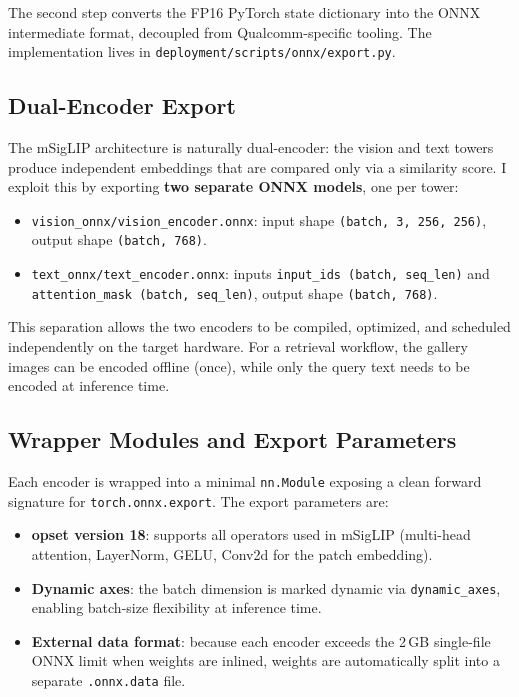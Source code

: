 \documentclass[../main.tex]{subfiles}
\begin{document}
\noindent The second step converts the FP16 PyTorch state dictionary into the ONNX intermediate format, decoupled from Qualcomm-specific tooling. The implementation lives in \texttt{deployment/scripts/onnx/export.py}.

\subsection{Dual-Encoder Export}

\noindent The mSigLIP architecture is naturally dual-encoder: the vision and text towers produce independent embeddings that are compared only via a similarity score. I exploit this by exporting \textbf{two separate ONNX models}, one per tower:

\begin{itemize}
    \item \texttt{vision\_onnx/vision\_encoder.onnx}: input shape \texttt{(batch, 3, 256, 256)}, output shape \texttt{(batch, 768)}.
    \item \texttt{text\_onnx/text\_encoder.onnx}: inputs \texttt{input\_ids (batch, seq\_len)} and \texttt{attention\_mask (batch, seq\_len)}, output shape \texttt{(batch, 768)}.
\end{itemize}

\noindent This separation allows the two encoders to be compiled, optimized, and scheduled independently on the target hardware. For a retrieval workflow, the gallery images can be encoded offline (once), while only the query text needs to be encoded at inference time.

\subsection{Wrapper Modules and Export Parameters}

\noindent Each encoder is wrapped into a minimal \texttt{nn.Module} exposing a clean forward signature for \texttt{torch.onnx.export}. The export parameters are:

\begin{itemize}
    \item \textbf{opset version 18}: supports all operators used in mSigLIP (multi-head attention, LayerNorm, GELU, Conv2d for the patch embedding).
    \item \textbf{Dynamic axes}: the batch dimension is marked dynamic via \texttt{dynamic\_axes}, enabling batch-size flexibility at inference time.
    \item \textbf{External data format}: because each encoder exceeds the 2\,GB single-file ONNX limit when weights are inlined, weights are automatically split into a separate \texttt{.onnx.data} file.
\end{itemize}
\end{document}
